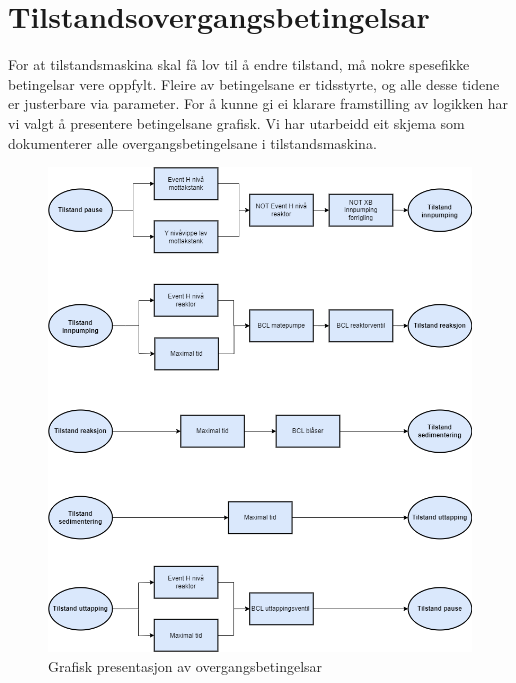 \section{Tilstandsovergangsbetingelsar}
\thispagestyle{fancy}

For at tilstandsmaskina skal få lov til å endre tilstand, må nokre spesefikke betingelsar vere oppfylt.
Fleire av betingelsane er tidsstyrte, og alle desse tidene er justerbare via parameter.\newline
For å kunne gi ei klarare framstilling av logikken har vi valgt å presentere betingelsane grafisk.
Vi har utarbeidd eit skjema som dokumenterer alle overgangsbetingelsane i tilstandsmaskina.\newline \newline

\begin{figure}[htbp]
    \centering
    \includegraphics[scale=0.5]{Figurar/Tilstandsovergang.drawio.png}
    \caption{Grafisk presentasjon av overgangsbetingelsar}\label{fig:Tilstandsovergangsbetingelsar}
\end{figure}

\newpage